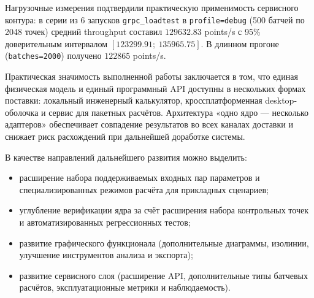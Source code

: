 Нагрузочные измерения подтвердили практическую применимость сервисного контура:
в серии из 6 запусков \texttt{grpc\_loadtest}
в \texttt{profile=debug}
(500 батчей по 2048 точек)
средний throughput составил $129632.83$ points/s
с 95\% доверительным интервалом
$[123299.91;\ 135965.75]$.
В длинном прогоне (\texttt{batches=2000})
получено $122865$ points/s.  

Практическая значимость выполненной работы заключается в том, что единая физическая модель и единый программный API доступны в нескольких формах поставки: локальный инженерный калькулятор, кроссплатформенная desktop-оболочка и сервис для пакетных расчётов.  
Архитектура «одно ядро --- несколько адаптеров» обеспечивает совпадение результатов во всех каналах доставки и снижает риск расхождений при дальнейшей доработке системы.  

В качестве направлений дальнейшего развития можно выделить:
\begin{itemize}
\item расширение набора поддерживаемых входных пар параметров и специализированных режимов расчёта для прикладных сценариев;  
\item углубление верификации ядра за счёт расширения набора контрольных точек и автоматизированных регрессионных тестов;  
\item развитие графического функционала (дополнительные диаграммы, изолинии, улучшение инструментов анализа и экспорта);  
\item развитие сервисного слоя (расширение API, дополнительные типы батчевых расчётов, эксплуатационные метрики и наблюдаемость).  
\end{itemize}
